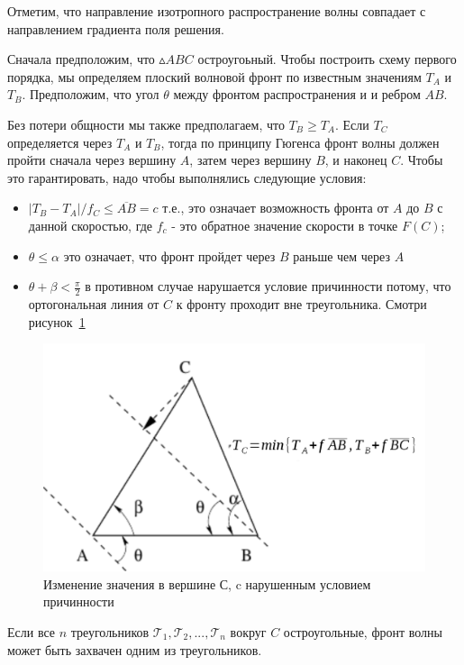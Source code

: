 \documentclass[a4paper,12pt]{article}
\begin{document}
Отметим, что направление изотропного распространение волны совпадает с
направлением градиента поля решения.

Сначала предположим, что $\vartriangle ABC$ остроугоьный. Чтобы
построить схему первого порядка, мы определяем плоский волновой фронт
по известным значениям $T_A$ и $T_B$. Предположим, что угол $\theta$
между фронтом распространения и и ребром $AB$.

Без потери общности мы также предполагаем, что $T_B \ge T_A$. Если
$T_C$ определяется через $T_A$ и $T_B$, тогда по принципу Гюгенса
фронт волны должен пройти сначала через вершину $A$, затем через
вершину $B$, и наконец $C$. Чтобы это гарантировать, надо чтобы
выполнялись следующие условия:
\begin{itemize}
\item $|T_B-T_A| / f_C \le \overline{AB} = c$ т.е., это означает
  возможность фронта от $A$ до $B$ с данной скоростью, где $f_c$ - это
  обратное значение скорости в точке $F(C)$;
\item $\theta \le \alpha$ это означает, что фронт пройдет через $B$
  раньше чем через $A$
\item $\theta + \beta < \frac{\pi}{2}$ в противном случае нарушается
  условие причинности потому, что ортогональная линия от $C$ к фронту
  проходит вне треугольника. Смотри рисунок~\ref{fig:triangle-front}
\end{itemize}

\begin{figure}[H]
  \centering
  \includegraphics[width=0.7\linewidth]{triangle-front.png}
  \hfil \caption{Изменение значения в вершине С, c нарушенным условием
  причинности}
  \label{fig:triangle-front}

\end{figure}

Если все $n$ треугольников $\mathcal{T}_1,\mathcal{T}_2,...,\mathcal{T}_n$
вокруг $C$ остроугольные, фронт волны может быть захвачен одним из
треугольников.
\end{document}
